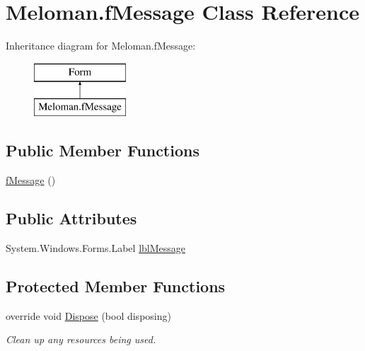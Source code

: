 \hypertarget{class_meloman_1_1f_message}{}\section{Meloman.\+f\+Message Class Reference}
\label{class_meloman_1_1f_message}
Inheritance diagram for Meloman.\+f\+Message\+:\begin{figure}[H]
\begin{center}
\leavevmode
\includegraphics[height=2.000000cm]{class_meloman_1_1f_message}
\end{center}
\end{figure}
\subsection*{Public Member Functions}
\begin{DoxyCompactItemize}
\item 
\mbox{\hyperlink{class_meloman_1_1f_message_ac2fa06bfe5a4d515f0cea78c2eafcabc}{f\+Message}} ()
\end{DoxyCompactItemize}
\subsection*{Public Attributes}
\begin{DoxyCompactItemize}
\item 
System.\+Windows.\+Forms.\+Label \mbox{\hyperlink{class_meloman_1_1f_message_a72382f0a92f831b506fb2a6f7a0f6168}{lbl\+Message}}
\end{DoxyCompactItemize}
\subsection*{Protected Member Functions}
\begin{DoxyCompactItemize}
\item 
override void \mbox{\hyperlink{class_meloman_1_1f_message_acdbb2090f3460ef3b2790cb7d1f6b16e}{Dispose}} (bool disposing)
\begin{DoxyCompactList}\small\item\em Clean up any resources being used. \end{DoxyCompactList}\end{DoxyCompactItemize}


